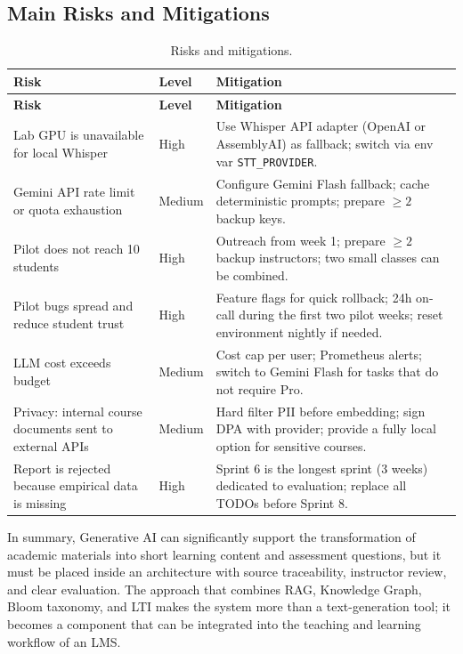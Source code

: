 \subsection{Main Risks and Mitigations}
\label{subsec:risks-gd2}

\begin{longtable}{|p{4.5cm}|p{1.5cm}|p{8.5cm}|}
    \caption{Risks and mitigations.}
    \label{tab:risks-gd2} \\
    \hline
    \textbf{Risk} & \textbf{Level} & \textbf{Mitigation} \\
    \hline
    \endfirsthead
    \hline
    \textbf{Risk} & \textbf{Level} & \textbf{Mitigation} \\
    \hline
    \endhead

    Lab GPU is unavailable for local Whisper
        & High
        & Use Whisper API adapter (OpenAI or AssemblyAI) as fallback;
          switch via env var \texttt{STT\_PROVIDER}. \\ \hline
    Gemini API rate limit or quota exhaustion
        & Medium
        & Configure Gemini Flash fallback; cache deterministic prompts;
          prepare $\geq 2$ backup keys. \\ \hline
    Pilot does not reach 10 students
        & High
        & Outreach from week 1; prepare $\geq 2$ backup instructors; two
          small classes can be combined. \\ \hline
    Pilot bugs spread and reduce student trust
        & High
        & Feature flags for quick rollback; 24h on-call during the first
          two pilot weeks; reset environment nightly if needed. \\ \hline
    LLM cost exceeds budget
        & Medium
        & Cost cap per user; Prometheus alerts; switch to Gemini Flash
          for tasks that do not require Pro. \\ \hline
    Privacy: internal course documents sent to external APIs
        & Medium
        & Hard filter PII before embedding; sign DPA with provider;
          provide a fully local option for sensitive courses. \\ \hline
    Report is rejected because empirical data is missing
        & High
        & Sprint 6 is the longest sprint (3 weeks) dedicated to
          evaluation; replace all TODOs before Sprint 8. \\ \hline
\end{longtable}

In summary, Generative AI can significantly support the transformation
of academic materials into short learning content and assessment
questions, but it must be placed inside an architecture with source
traceability, instructor review, and clear evaluation. The approach that
combines RAG, Knowledge Graph, Bloom taxonomy, and LTI makes the system
more than a text-generation tool; it becomes a component that can be
integrated into the teaching and learning workflow of an LMS.
